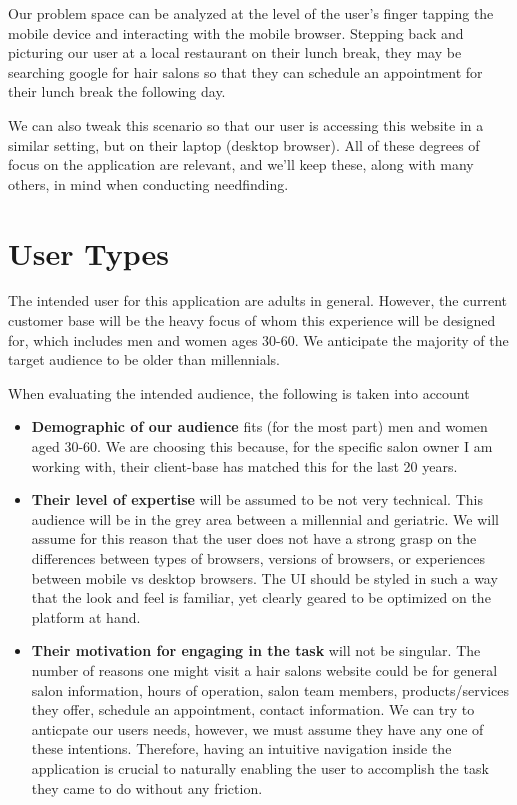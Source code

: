 Our problem space can be analyzed at the level of the user's finger tapping the mobile device and interacting with the mobile browser. Stepping back and picturing our user at a local restaurant on their lunch break, they may be searching google for hair salons so that they can schedule an appointment for their lunch break the following day.

\clearpage

We can also tweak this scenario so that our user is accessing this website in a similar setting, but on their laptop (desktop browser). All of these degrees of focus on the application are relevant, and we'll keep these, along with many others, in mind when conducting needfinding.

\section{User Types}
The intended user for this application are adults in general. However, the current customer base will be the heavy focus of whom this experience will be designed for, which includes men and women ages 30-60. We anticipate the majority of the target audience to be older than millennials.

When evaluating the intended audience, the following is taken into account

\begin{itemize}
\item
  \textbf{Demographic of our audience} fits (for the most part) men and women aged 30-60. We are choosing this because, for the specific salon owner I am working with, their client-base has matched this for the last 20 years.
\item
  \textbf{Their level of expertise} will be assumed to be not very technical. This audience will be in the grey area between a millennial and geriatric. We will assume for this reason that the user does not have a strong grasp on the differences between types of browsers, versions of browsers, or experiences between mobile vs desktop browsers. The UI should be styled in such a way that the look and feel is familiar, yet clearly geared to be optimized on the platform at hand.
\item
  \textbf{Their motivation for engaging in the task} will not be singular. The number of reasons one might visit a hair salons website could be for general salon information, hours of operation, salon team members, products/services they offer, schedule an appointment, contact information. We can try to anticpate our users needs, however, we must assume they have any one of these intentions. Therefore, having an intuitive navigation inside the application is crucial to naturally enabling the user to accomplish the task they came to do without any friction.
\end{itemize}

